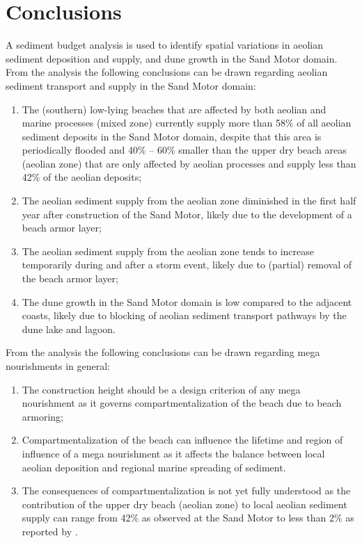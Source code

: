 \section{Conclusions}

A sediment budget analysis is used to identify spatial variations in
aeolian sediment deposition and supply, and dune growth in the Sand
Motor domain. From the analysis the following conclusions can be drawn
regarding aeolian sediment transport and supply in the Sand Motor
domain:

\begin{enumerate}
\item The (southern) low-lying beaches that are affected by both
  aeolian and marine processes (mixed zone) currently supply more than
  58\% of all aeolian sediment deposits in the Sand Motor domain,
  despite that this area is periodically flooded and 40\% -- 60\%
  smaller than the upper dry beach areas (aeolian zone) that are only
  affected by aeolian processes and supply less than 42\% of the
  aeolian deposits;
\item The aeolian sediment supply from the aeolian zone diminished in
  the first half year after construction of the Sand Motor, likely due
  to the development of a beach armor layer;
\item The aeolian sediment supply from the aeolian zone tends to
  increase temporarily during and after a storm event, likely due to
  (partial) removal of the beach armor layer;
\item The dune growth in the Sand Motor domain is low compared to the
  adjacent coasts, likely due to blocking of aeolian sediment
  transport pathways by the dune lake and lagoon.
\end{enumerate}

\noindent From the analysis the following conclusions can be drawn
regarding mega nourishments in general:

\begin{enumerate}
\item The construction height should be a design criterion of any mega
  nourishment as it governs compartmentalization of the beach due to
  beach armoring;
\item Compartmentalization of the beach can influence the lifetime and
  region of influence of a mega nourishment as it affects the balance
  between local aeolian deposition and regional marine spreading of
  sediment.
\item The consequences of compartmentalization is not yet fully
  understood as the contribution of the upper dry beach (aeolian zone)
  to local aeolian sediment supply can range from 42\% as observed at
  the Sand Motor to less than 2\% as reported by \citet{Jackson2010}.
\end{enumerate}

